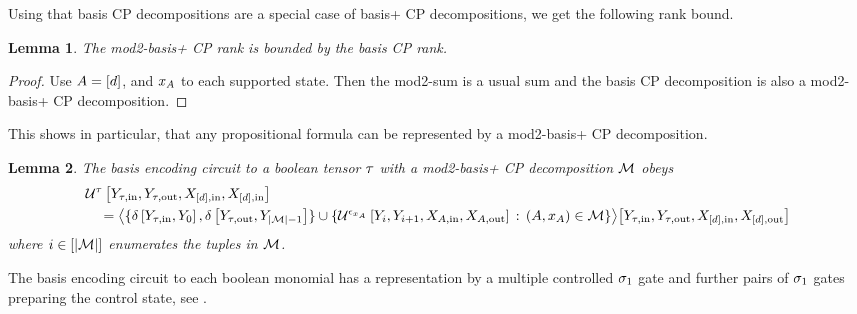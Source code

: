 \documentclass[aps,onecolumn,nofootinbib,pra]{article}
\newtheorem{lemma}{Lemma}
\begin{document}
    Using that basis CP decompositions are a special case of basis+ CP decompositions, we get the following rank bound.

    \begin{lemma}
        The mod2-basis+ CP rank is bounded by the basis CP rank.
    \end{lemma}
    \begin{proof}
        Use $A=[d]$, and $x_{A}$ to each supported state.
        Then the mod2-sum is a usual sum and the basis CP decomposition is also a mod2-basis+ CP decomposition.
    \end{proof}

    This shows in particular, that any propositional formula can be represented by a mod2-basis+ CP decomposition.

    \begin{lemma}
        The basis encoding circuit to a boolean tensor $\tau$ with a mod2-basis+ CP decomposition $\mathcal{M}$ obeys
        \begin{align*}
            &\mathcal{U}^{\tau}\left[
                Y_{\tau,\mathrm{in}},Y_{\tau,\mathrm{out}},X_{[d],\mathrm{in}},X_{[d],\mathrm{in}}
            \right] \\
            & \quad =
            \big\langle 
                \{\delta\left[Y_{\tau,\mathrm{in}},Y_{0}\right],\delta\left[Y_{\tau,\mathrm{out}},Y_{\left|\mathcal{M}\right|-1}\right]\} \cup
                \{\mathcal{U}^{\epsilon_{x_{A}}}\left[
                Y_{i}, Y_{i+1},
                X_{A,\mathrm{in}},X_{A,\mathrm{out}}\right] \,:\, (A,x_{A})\in\mathcal{M}\}
             \big\rangle \big[ Y_{\tau,\mathrm{in}},Y_{\tau,\mathrm{out}},X_{[d],\mathrm{in}},X_{[d],\mathrm{out}} \big]
        \end{align*}
        where $i\in[\left|\mathcal{M}\right|]$ enumerates the tuples in $\mathcal{M}$.
    \end{lemma}

    The basis encoding circuit to each boolean monomial has a representation by a multiple controlled $\sigma_1$ gate and further pairs of $\sigma_1$ gates preparing the control state, see .
\end{document}
